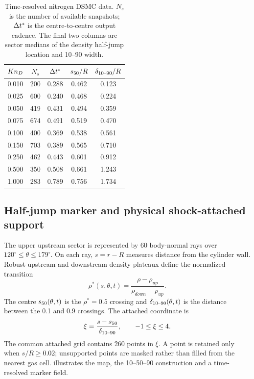 \begin{table}
\centering
\caption{Time-resolved nitrogen DSMC data. $N_s$ is the number of available snapshots; $\Delta t^*$ is the centre-to-centre output cadence. The final two columns are sector medians of the density half-jump location and 10--90 width.}
\label{tab:data}
\small
\begin{tabular}{ccccc}
\toprule
$Kn_D$ & $N_s$ & $\Delta t^*$ & $s_{50}/R$ & $\delta_{10\text{--}90}/R$ \\
\midrule
0.010 & 200 & 0.288 & 0.462 & 0.123 \\
0.025 & 600 & 0.240 & 0.468 & 0.224 \\
0.050 & 419 & 0.431 & 0.494 & 0.359 \\
0.075 & 674 & 0.491 & 0.519 & 0.470 \\
0.100 & 400 & 0.369 & 0.538 & 0.561 \\
0.150 & 703 & 0.389 & 0.565 & 0.710 \\
0.250 & 462 & 0.443 & 0.601 & 0.912 \\
0.500 & 350 & 0.508 & 0.661 & 1.243 \\
1.000 & 283 & 0.789 & 0.756 & 1.734 \\
\bottomrule
\end{tabular}
\end{table}

\subsection{Half-jump marker and physical shock-attached support}
The upper upstream sector is represented by 60 body-normal rays over $120^\circ\leq\theta\leq179^\circ$. On each ray, $s=r-R$ measures distance from the cylinder wall. Robust upstream and downstream density plateaux define the normalized transition
\begin{equation}
 \rho^*(s,\theta,t)=\frac{\rho-\rho_{up}}{\rho_{down}-\rho_{up}}.
\end{equation}
The centre $s_{50}(\theta,t)$ is the $\rho^*=0.5$ crossing and $\delta_{10\text{--}90}(\theta,t)$ is the distance between the 0.1 and 0.9 crossings. The attached coordinate is
\begin{equation}
 \xi=\frac{s-s_{50}}{\delta_{10\text{--}90}}, \qquad -1\leq\xi\leq4.
 \label{eq:xi}
\end{equation}
The common attached grid contains 260 points in $\xi$. A point is retained only when $s/R\geq0.02$; unsupported points are masked rather than filled from the nearest gas cell.  illustrates the map, the 10--50--90 construction and a time-resolved marker field.

